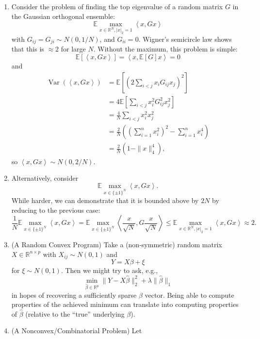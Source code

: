 \begin{enumerate}
\def\labelenumi{\arabic{enumi}.}
\tightlist
\item
  Consider the problem of finding the top eigenvalue of a random matrix
  \(G\) in the Gaussian orthogonal ensemble: \[
   \mathbb E \max_{x \in \mathbb{R}^N, |x|_2 = 1} \left\langle x, Gx \right\rangle
  \] with \(G_{ij} = G_{ji} \sim N(0, 1/N)\), and \(G_{ii} = 0\).
  Wigner's semicircle law shows that this is \(\approx 2\) for large
  \(N\). Without the maximum, this problem is simple: \[
   \mathbb E[\left\langle x, Gx \right\rangle] = \left\langle x, \mathbb E[G]x \right\rangle = 0
  \] and \[
  \begin{align*}
   \mathop{\mathrm{Var}}(\left\langle x, Gx \right\rangle) &= \mathbb E \left[ \left( 2\sum_{i < j}x_i G_{ij}x_j \right)^2 \right] \\
   &= 4\mathbb E \left[ \sum_{i < j} x_i^2 G_{ij}^2 x_j^2 \right] \\ 
   &= \frac{4}{N} \sum_{i < j} x_i^2 x_j^2 \\
   &= \frac{2}{N} \left( \left(\sum_{i = 1}^n x_i^2 \right)^2 - \sum_{i=1}^n x_i^4 \right) \\
   &= \frac{2}{N} \left( 1 - \|x\|_4^4 \right),
  \end{align*}
  \] so \(\left\langle x, Gx \right\rangle \sim N(0, 2/N)\).
\item
  Alternatively, consider \[
   \mathbb E \max_{x \in \{\pm 1\}^N} \left\langle x, Gx \right\rangle.
  \] While harder, we can demonstrate that it is bounded above by \(2N\)
  by reducing to the previous case: \[
   \frac{1}{N}\mathbb E \max_{x \in \{\pm 1\}^N} \left\langle x, Gx \right\rangle = 
   \mathbb E \max_{x \in \{\pm 1\}^N} \left\langle \frac{x}{\sqrt{N}}, G \frac{x}{\sqrt{N}} \right\rangle \leq 
   \mathbb E \max_{x \in \mathbb{R}^N, |x|_2 = 1} \left\langle x, Gx \right\rangle \approx 2.
  \]
\item
  (A Random Convex Program) Take a (non-symmetric) random matrix
  \(X \in \mathbb R^{n \times p}\) with \(X_{ij} \sim N(0, 1)\) and \[
   Y = X \beta + \xi
  \] for \(\xi \sim N(0, 1)\). Then we might try to ask, e.g., \[
   \min_{\hat \beta \in \mathbb{R}^p} \|Y - X\hat \beta\|_2^2 + \lambda \|\hat \beta\|_1
  \] in hopes of recovering a sufficiently sparse \(\beta\) vector.
  Being able to compute properties of the achieved minimum can translate
  into computing properties of \(\hat \beta\) (relative to the ``true''
  underlying \(\beta\)).
\item
  (A Nonconvex/Combinatorial Problem) Let

\end{enumerate}
